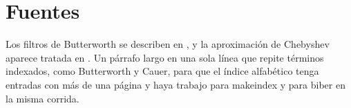 \documentclass[11pt]{article}
\begin{document}
\section{Fuentes}

Los filtros de Butterworth se describen en \parencite{butterworth1930}, y la aproximación de Chebyshev aparece tratada en \textcite{papoulis1958}. Un párrafo largo en una sola línea que repite términos indexados, como Butterworth y Cauer, para que el índice alfabético tenga entradas con más de una página y haya trabajo para makeindex y para biber en la misma corrida.

\nocite{cauer1958}

\printbibliography

\printindex
\end{document}
